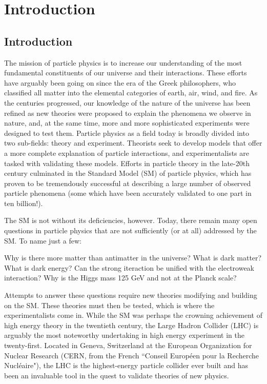 \chapter{Introduction}

\section{Introduction}\label{sec:intro}

The mission of particle physics is to increase our understanding of the most fundamental constituents of our universe and their interactions. These efforts have arguably been going on since the era of the Greek philosophers, who classified all matter into the elemental categories of earth, air, wind, and fire. As the centuries progressed, our knowledge of the nature of the universe has been refined as new theories were proposed to explain the phenomena we observe in nature, and, at the same time, more and more sophisticated experiments were designed to test them. Particle physics as a field today is broadly divided into two sub-fields: theory and experiment. Theorists seek to develop models that offer a more complete explanation of particle interactions, and experimentalists are tasked with validating these models. Efforts in particle theory in the late-20th century culminated in the Standard Model (SM) of particle physics, which has proven to be tremendously successful at describing a large number of observed particle phenomena (some which have been accurately validated to one part in ten billion!).

The SM is not without its deficiencies, however. Today, there remain many open questions in particle physics that are not sufficiently (or at all) addressed by the SM. To name just a few: 

Why is there more matter than antimatter in the universe?
What is dark matter?
What is dark energy?
Can the strong iteraction be unified with the electroweak interaction?
Why is the Higgs mass 125 GeV and not at the Planck scale?

Attempts to answer these questions require new theories modifying and building on the SM. These theories must then be tested, which is where the experimentalists come in. While the SM was perhaps the crowning achievement of high energy theory in the twentieth century, the Large Hadron Collider (LHC) is arguably the most noteworthy undertaking in high energy experiment in the twenty-first. Located in Geneva, Switzerland at the European Organization for Nuclear Research (CERN, from the French ``Conseil Européen pour la Recherche Nucléaire"), the LHC is the highest-energy particle collider ever built and has been an invaluable tool in the quest to validate theories of new physics.


